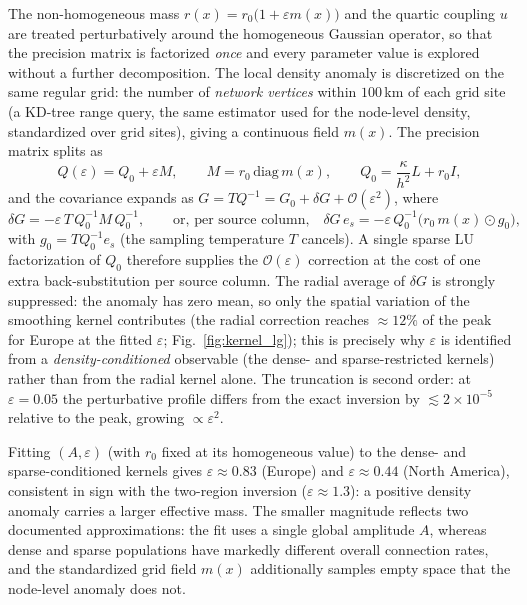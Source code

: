 \noindent The non-homogeneous mass $r(x)=r_0\bigl(1+\varepsilon m(x)\bigr)$ and the quartic coupling $u$ are treated
perturbatively around the homogeneous Gaussian operator, so that the precision matrix is factorized \emph{once}
and every parameter value is explored without a further decomposition. The local density anomaly is discretized
on the same regular grid: the number of \emph{network vertices} within $100$\,km of each grid site (a KD-tree
range query, the same estimator used for the node-level density, standardized over grid sites), giving a
continuous field $m(x)$. The precision matrix splits as
\begin{equation}
Q(\varepsilon)=Q_0+\varepsilon M,\qquad M=r_0\,\mathrm{diag}\,m(x),\qquad
Q_0=\frac{\kappa}{h^2}L+r_0 I,
\end{equation}
and the covariance expands as $G=TQ^{-1}=G_0+\delta G+\mathcal{O}(\varepsilon^2)$, where
\begin{equation}
\delta G=-\varepsilon\,T\,Q_0^{-1}M\,Q_0^{-1},
\qquad\text{or, per source column,}\quad
\delta G\,e_s=-\varepsilon\,Q_0^{-1}\bigl(r_0\,m(x)\odot g_0\bigr),
\end{equation}
with $g_0=TQ_0^{-1}e_s$ (the sampling temperature $T$ cancels). A single sparse LU factorization of $Q_0$
therefore supplies the $\mathcal{O}(\varepsilon)$ correction at the cost of one extra back-substitution per
source column. The radial average of $\delta G$ is strongly suppressed: the anomaly has zero mean, so only the
spatial variation of the smoothing kernel contributes (the radial correction reaches $\approx12\%$ of the peak
for Europe at the fitted $\varepsilon$; Fig.~\ref{fig:kernel_lg}); this is precisely why $\varepsilon$ is
identified from a \emph{density-conditioned} observable (the dense- and sparse-restricted kernels) rather than
from the radial kernel alone. The truncation is second order: at $\varepsilon=0.05$ the perturbative profile
differs from the exact inversion by $\lesssim2\times10^{-5}$ relative to the peak, growing $\propto\varepsilon^2$.

\noindent Fitting $(A,\varepsilon)$ (with $r_0$ fixed at its homogeneous value) to the dense- and
sparse-conditioned kernels gives $\varepsilon\approx0.83$ (Europe) and $\varepsilon\approx0.44$ (North
America), consistent in sign with the two-region inversion ($\varepsilon\approx1.3$): a positive density anomaly
carries a larger effective mass. The smaller magnitude reflects two documented approximations: the fit uses a
single global amplitude $A$, whereas dense and sparse populations have markedly different overall connection
rates, and the standardized grid field $m(x)$ additionally samples empty space that the node-level anomaly does
not.

